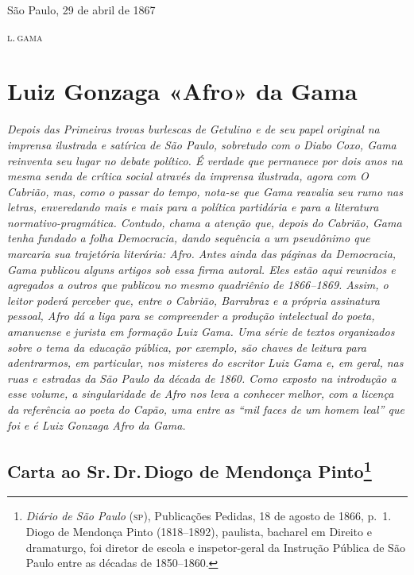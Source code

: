 \begin{flushright}
São Paulo, 29 de abril de 1867

\textsc{l.\,gama}
\end{flushright}

\part{Luiz Gonzaga «Afro» da Gama} %

\begin{argumento}\itshape
Depois das \textnormal{Primeiras trovas burlescas de Getulino} e de seu papel
original na imprensa ilustrada e satírica de São Paulo, sobretudo com o
\textnormal{Diabo Coxo}, Gama reinventa seu lugar no debate político. É verdade
que permanece por dois anos na mesma senda de crítica social através da
imprensa ilustrada, agora com \textnormal{O Cabrião}, mas, como o passar do
tempo, nota-se que Gama reavalia seu rumo nas letras, enveredando mais e
mais para a política partidária e para a literatura
normativo-pragmática. Contudo, chama a atenção que, depois do
\textnormal{Cabrião}, Gama tenha fundado a folha \textnormal{Democracia}, dando
sequência a um pseudônimo que marcaria sua trajetória literária:
Afro. Antes ainda das páginas da \textnormal{Democracia}, Gama publicou
alguns artigos sob essa firma autoral. Eles estão aqui reunidos e
agregados a outros que publicou no mesmo quadriênio de 1866--1869. Assim,
o leitor poderá perceber que, entre o \textnormal{Cabrião}, Barrabraz e
a própria assinatura pessoal, Afro dá a liga para se compreender
a produção intelectual do poeta, amanuense e jurista em formação Luiz
Gama. Uma série de textos organizados sobre o tema da educação pública,
por exemplo, são chaves de leitura para adentrarmos, em particular, nos
misteres do escritor Luiz Gama e, em geral, nas ruas e estradas da São
Paulo da década de 1860. Como exposto na introdução a esse volume, a
singularidade de Afro nos leva a conhecer melhor, com a licença
da referência ao poeta do Capão, uma entre as ``mil faces de um homem
leal'' que foi e é Luiz Gonzaga Afro da Gama.
\end{argumento}

\chapter{Carta ao Sr.\,Dr.\,Diogo de Mendonça Pinto\footnote{\emph{Diário
  de São Paulo} (\textsc{sp}), Publicações Pedidas, 18 de agosto de 1866, p.~1. Diogo de
  Mendonça Pinto (1818--1892), paulista, bacharel em Direito e
  dramaturgo, foi diretor de escola e inspetor-geral da Instrução
  Pública de São Paulo entre as décadas de 1850--1860.}}

